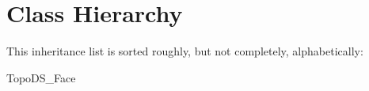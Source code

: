 \section{Class Hierarchy}
This inheritance list is sorted roughly, but not completely, alphabetically\-:\begin{DoxyCompactList}
\item {}
\item Topo\-D\-S\-\_\-\-Face\begin{DoxyCompactList}
\item {}
\begin{DoxyCompactList}
\item {}
\end{DoxyCompactList}
\end{DoxyCompactList}
\end{DoxyCompactList}
